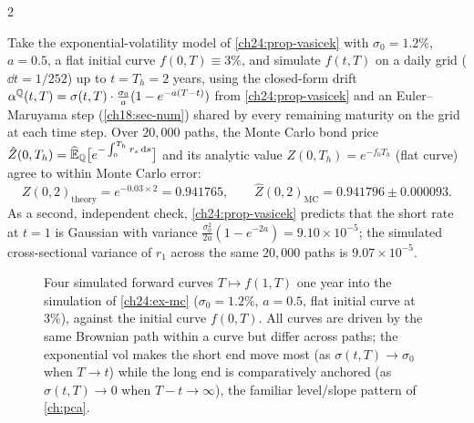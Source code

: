 \begin{paracol}{2}
\begin{example}\label{ch24:ex-mc}
Take the exponential-volatility model of \cref{ch24:prop-vasicek} with $\sigma_0=1.2\%$, $a=0.5$, a flat initial curve $f(0,T)\equiv3\%$, and simulate $f(t,T)$ on a daily grid ($\dd t=1/252$) up to $t=T_h=2$ years, using the closed-form drift $\alpha^{\mathbb{Q}}(t,T)=\sigma(t,T)\cdot\tfrac{\sigma_0}{a}(1-e^{-a(T-t)})$ from \cref{ch24:prop-vasicek} and an Euler--Maruyama step (\cref{ch18:sec-num}) shared by every remaining maturity on the grid at each time step. Over $20{,}000$ paths, the Monte Carlo bond price $\hat Z(0,T_h)=\widehat{\mathbb{E}}_{\mathbb{Q}}\bigl[e^{-\int_0^{T_h}r_s\,\mathrm{d} s}\bigr]$ and its analytic value $Z(0,T_h)=e^{-f_0T_h}$ (flat curve) agree to within Monte Carlo error:
\[
  Z(0,2)_{\text{theory}}=e^{-0.03\times2}=0.941765,\qquad \hat Z(0,2)_{\text{MC}}=0.941796\pm0.000093 .
\]
As a second, independent check, \cref{ch24:prop-vasicek} predicts that the short rate at $t=1$ is Gaussian with variance $\tfrac{\sigma_0^2}{2a}(1-e^{-2a})=9.10\times10^{-5}$; the simulated cross-sectional variance of $r_1$ across the same $20{,}000$ paths is $9.07\times10^{-5}$.
\end{example}

\begin{figure}[ht]
\centering
{}
\caption{Four simulated forward curves $T\mapsto f(1,T)$ one year into the simulation of \cref{ch24:ex-mc} ($\sigma_0=1.2\%$, $a=0.5$, flat initial curve at 3\%), against the initial curve $f(0,T)$. All curves are driven by the same Brownian path within a curve but differ across paths; the exponential vol makes the short end move most (as $\sigma(t,T)\to\sigma_0$ when $T\to t$) while the long end is comparatively anchored (as $\sigma(t,T)\to0$ when $T-t\to\infty$), the familiar level/slope pattern of \cref{ch:pca}.}\label{ch24:fig-curves}
\end{figure}


\end{paracol}
